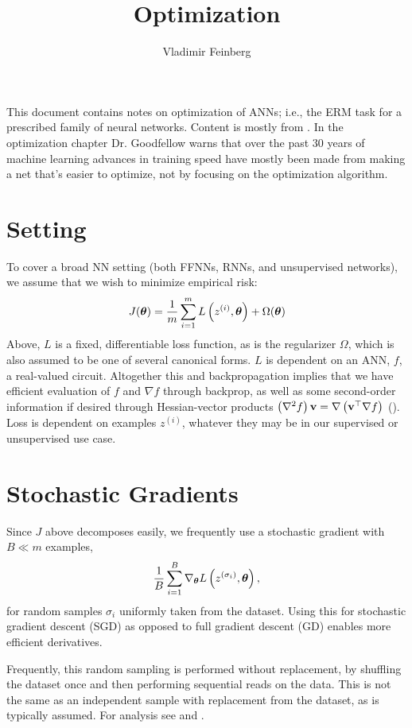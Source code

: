 \documentclass{article}
\title{Optimization}
\author{Vladimir Feinberg}
\begin{document}
\maketitle

This document contains notes on optimization of ANNs; i.e., the ERM task for a prescribed family of neural networks. Content is mostly from . In the optimization chapter Dr. Goodfellow warns that over the past 30 years of machine learning advances in training speed have mostly been made from making a net that's easier to optimize, not by focusing on the optimization algorithm.

\section{Setting}

To cover a broad NN setting (both FFNNs, RNNs, and unsupervised networks), we assume that we wish to minimize empirical risk:
$$
J({\boldsymbol\theta})=\frac{1}{m}\sum_{i=1}^mL\left({z^{(i)}, {\boldsymbol\theta}}\right) + \Omega({\boldsymbol\theta})
$$
Above, $L$ is a fixed, differentiable loss function, as is the regularizer $\Omega$, which is also assumed to be one of several canonical forms. $L$ is dependent on an ANN, $f$, a real-valued circuit. Altogether this and backpropagation implies that we have efficient evaluation of $f$ and $\nabla f$ through backprop, as well as some second-order information if desired through Hessian-vector products $\left({\nabla^2 f}\right)\textbf{v}=\nabla\left({\textbf{v}^\top\nabla f}\right)$ (). Loss is dependent on examples $z^{(i)}$, whatever they may be in our supervised or unsupervised use case.

\section{Stochastic Gradients}

Since $J$ above decomposes easily, we frequently use a stochastic gradient with $B\ll m$ examples,
$$\frac{1}{B}\sum_{i=1}^B\nabla_{\boldsymbol\theta} L\left({z^{(\sigma_i)}, {\boldsymbol\theta}}\right),$$ for random samples $\sigma_i$ uniformly taken from the dataset. Using this for stochastic gradient descent (SGD) as opposed to full gradient descent (GD) enables more efficient derivatives.

Frequently, this random sampling is performed without replacement, by shuffling the dataset once and then performing sequential reads on the data. This is not the same as an independent sample with replacement from the dataset, as is typically assumed. For analysis see  and .
\end{document}
